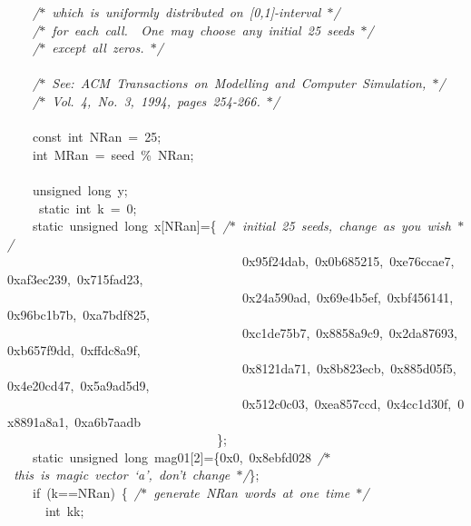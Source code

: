 {\ \ \ \ \textsl{/$\ast$\ which\ is\ uniformly\ distributed\ on\ [0,1]-{}interval\ $\ast$/}\\
\ \ \ \ \textsl{/$\ast$\ for\ each\ call.\ \ One\ may\ choose\ any\ initial\ 25\ seeds\ $\ast$/}\\
\ \ \ \ \textsl{/$\ast$\ except\ all\ zeros.\ $\ast$/}\\
\ \\
\ \ \ \ \textsl{/$\ast$\ See:\ ACM\ Transactions\ on\ Modelling\ and\ Computer\ Simulation,\ $\ast$/}\\
\ \ \ \ \textsl{/$\ast$\ Vol.\ 4,\ No.\ 3,\ 1994,\ pages\ 254-{}266.\ $\ast$/}\\
\ \\
\ \ \ \ const\ int\ NRan\ =\ 25;\\
\ \ \ \ int\ MRan\ =\ seed\ \%\ NRan;\\
\ \\
\ \ \ \ unsigned\ long\ y;\\
\ \ \ \ \ static\ int\ k\ =\ 0;\\
\ \ \ \ static\ unsigned\ long\ x[NRan]=\{\ \textsl{/$\ast$\ initial\ 25\ seeds,\ change\ as\ you\ wish\ $\ast$/}\\
\ \ \ \ \ \ \ \ \ \ \ \ \ \ \ \ \ \ \ \ \ \ \ \ \ \ \ \ \ \ \ \ \ \ \ \ \ 0x95f24dab,\ 0x0b685215,\ 0xe76ccae7,\ 0xaf3ec239,\ 0x715fad23,\\
\ \ \ \ \ \ \ \ \ \ \ \ \ \ \ \ \ \ \ \ \ \ \ \ \ \ \ \ \ \ \ \ \ \ \ \ \ 0x24a590ad,\ 0x69e4b5ef,\ 0xbf456141,\ 0x96bc1b7b,\ 0xa7bdf825,\\
\ \ \ \ \ \ \ \ \ \ \ \ \ \ \ \ \ \ \ \ \ \ \ \ \ \ \ \ \ \ \ \ \ \ \ \ \ 0xc1de75b7,\ 0x8858a9c9,\ 0x2da87693,\ 0xb657f9dd,\ 0xffdc8a9f,\\
\ \ \ \ \ \ \ \ \ \ \ \ \ \ \ \ \ \ \ \ \ \ \ \ \ \ \ \ \ \ \ \ \ \ \ \ \ 0x8121da71,\ 0x8b823ecb,\ 0x885d05f5,\ 0x4e20cd47,\ 0x5a9ad5d9,\\
\ \ \ \ \ \ \ \ \ \ \ \ \ \ \ \ \ \ \ \ \ \ \ \ \ \ \ \ \ \ \ \ \ \ \ \ \ 0x512c0c03,\ 0xea857ccd,\ 0x4cc1d30f,\ 0x8891a8a1,\ 0xa6b7aadb\\
\ \ \ \ \ \ \ \ \ \ \ \ \ \ \ \ \ \ \ \ \ \ \ \ \ \ \ \ \ \ \ \ \ \};\\
\ \ \ \ static\ unsigned\ long\ mag01[2]=\{0x0,\ 0x8ebfd028\ \textsl{/$\ast$\ this\ is\ magic\ vector\ `a',\ don't\ change\ $\ast$/}\};\\
\ \ \ \ if\ (k==NRan)\ \{\ \textsl{/$\ast$\ generate\ NRan\ words\ at\ one\ time\ $\ast$/}\\
\ \ \ \ \ \ int\ kk;\\
}
